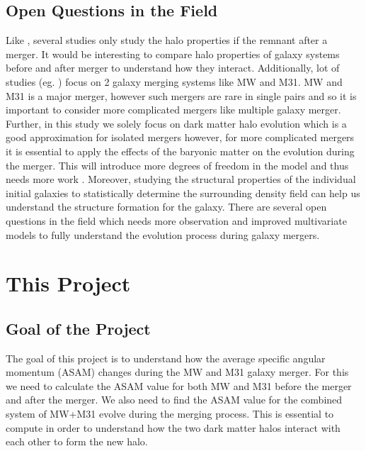 \documentclass[twocolumn]{aastex631}
\begin{document}
\subsection{Open Questions in the Field}
Like \citep{D'Onghia2007}, several studies only study the halo properties if the remnant after a merger. It would be interesting to compare halo properties of galaxy systems before and after merger to understand how they interact. Additionally, lot of studies (eg. \citep{Cox2008} ) focus on 2 galaxy merging systems like MW and M31. MW and M31 is a major merger, however such mergers are rare in single pairs and so it is important to consider more complicated mergers like multiple galaxy merger. Further, in this study we solely focus on dark matter halo evolution which is a good approximation for isolated mergers \citep{Kazantzidis2006} however, for more complicated mergers it is essential to apply the effects of the baryonic matter on the evolution during the merger. This will introduce more degrees of freedom in the model and thus needs more work \citep{Drakos2019a}. Moreover, studying the structural properties of the individual initial galaxies to statistically determine the surrounding density field can help us understand the structure formation for the galaxy. There are several open questions in the field which needs more observation and improved multivariate models to fully understand the evolution process during galaxy mergers.

\section{This Project} \label{sec:project}
\subsection{Goal of the Project}
The goal of this project is to understand how the average specific angular momentum (ASAM) changes during the MW and M31 galaxy merger. For this we need to calculate the ASAM value for both MW and M31 before the merger and after the merger. We also need to find the ASAM value for the combined system of MW+M31 evolve during the merging process. This is essential to compute in order to understand how the two dark matter halos interact with each other to form the new halo.
\end{document}
